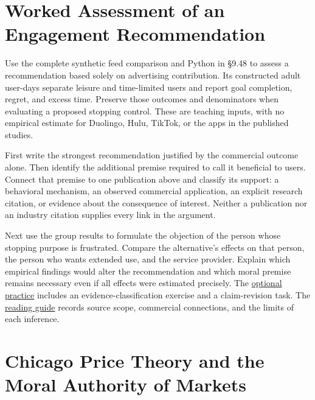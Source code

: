 
\hypertarget{M09-worked-assessment-of-an-engagement-recommendation}{%
\section{Worked Assessment of an Engagement
Recommendation}\label{M09-worked-assessment-of-an-engagement-recommendation}}

\noindent \noindent Use the complete synthetic feed comparison and Python in §9.48
to assess a recommendation based solely on advertising contribution. Its
constructed adult user-days separate leisure and time-limited users and
report goal completion, regret, and excess time. Preserve those outcomes
and denominators when evaluating a proposed stopping control. These are
teaching inputs, with no empirical estimate for Duolingo, Hulu, TikTok,
or the apps in the published studies.

First write the strongest recommendation justified by the commercial
outcome alone. Then identify the additional premise required to call it
beneficial to users. Connect that premise to one publication above and
classify its support: a behavioral mechanism, an observed commercial
application, an explicit research citation, or evidence about the
consequence of interest. Neither a publication nor an industry citation
supplies every link in the argument.

Next use the group results to formulate the objection of the person
whose stopping purpose is frustrated. Compare the alternative's effects
on that person, the person who wants extended use, and the service
provider. Explain which empirical findings would alter the
recommendation and which moral premise remains necessary even if all
effects were estimated precisely. The
\href{../07_Labs/Conflicts_of_Interest/README.md\#marketing-publications-and-unwanted-continuation}{optional
practice} includes an evidence-classification exercise and a
claim-revision task. The
\href{../01_Resources/49_Online_Engagement_and_Agency/README.md}{reading
guide} records source scope, commercial connections, and the limits of
each inference.


\hypertarget{M09-chicago-price-theory-and-the-moral-authority-of-markets}{%
\section{Chicago Price Theory and the Moral Authority of
Markets}\label{M09-chicago-price-theory-and-the-moral-authority-of-markets}}

